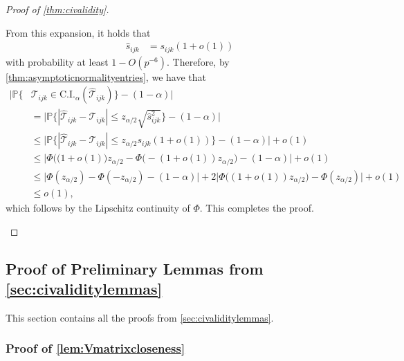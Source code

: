 \documentclass[10pt]{article}
\newcommand{\0}{{\mathbf{0}}}
\newcommand{\1}{{\mathbf{1}}}
\newcommand{\p}{\mathbb{P}}
\renewcommand{\hat}{\widehat}
\renewcommand{\hat}{\widehat}
\begin{document}
\begin{proof}[Proof of \cref{thm:civalidity}]
\begin{itemize}
 From this expansion, it holds that
\begin{align*}
    \hat s_{ijk} &= s_{ijk}(1 + o(1))
\end{align*}
with probability at least $1 - O(p^{-6})$.  Therefore, by \cref{thm:asymptoticnormalityentries}, we have that 
\begin{align*}
    \bigg| \p\bigg\{ &\mathcal{T}_{ijk} \in \mathrm{C.I.}_{\alpha}( \mathcal{\hat T}_{ijk} ) \bigg\} - (1 - \alpha) \bigg| \\
    &= \bigg| \p\bigg\{ | \mathcal{\hat T}_{ijk} - \mathcal{T}_{ijk} | \leq z_{\alpha/2} \sqrt{\hat s^2_{ijk}} \bigg\} - (1 - \alpha ) \bigg| \\
    &\leq \bigg| \p\bigg\{ |\mathcal{\hat T}_{ijk} - \mathcal{T}_{ijk} | \leq z_{\alpha/2} s_{ijk} (1 + o(1)) \bigg\} - (1-\alpha) \bigg| + o(1) \\
    &\leq \bigg| \Phi\big( (1+o(1)\big) z_{\alpha/2} - \Phi\big(-(1+o(1))z_{\alpha/2} \big) - (1-\alpha) \bigg| + o(1) \\
    &\leq \bigg| \Phi(z_{\alpha/2}) - \Phi(-z_{\alpha/2}) - (1-\alpha) \bigg| + 2 \bigg| \Phi\big(  (1+ o(1))z_{\alpha/2} \big) - \Phi(z_{\alpha/2}) \bigg| + o(1) \\
    &\leq o(1),
\end{align*}
which follows by the Lipschitz continuity of $\Phi$.  This completes the proof.
\end{itemize}
\end{proof}




\subsection{Proof of Preliminary Lemmas from \cref{sec:civaliditylemmas}}
\label{sec:prelimproofsvalidity}

This section contains all the proofs from \cref{sec:civaliditylemmas}.

\subsubsection{Proof of \cref{lem:Vmatrixcloseness}}
\end{document}
